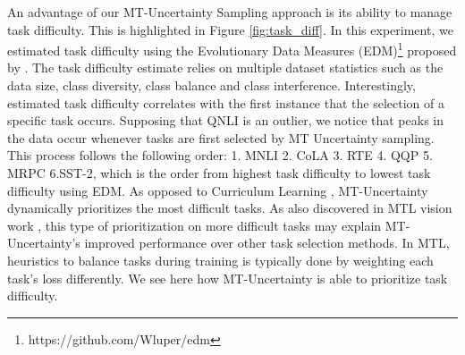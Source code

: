 \documentclass{article} \usepackage{iclr2021_conference,times}
\begin{document}
\clearpage
An advantage of our MT-Uncertainty Sampling approach is its ability to manage task difficulty. This is highlighted in Figure \ref{fig:task_diff}. In this experiment, we estimated task difficulty using the Evolutionary Data Measures (EDM)\footnote{https://github.com/Wluper/edm} proposed by \citet{collins-etal-2018-evolutionary}. The task difficulty estimate relies on multiple dataset statistics such as the data size, class diversity, class balance and class interference. Interestingly, estimated task difficulty correlates with the first instance that the selection of a specific task occurs. Supposing that QNLI is an outlier, we notice that peaks in the data occur whenever tasks are first selected by MT Uncertainty sampling. This process follows the following order: 1. MNLI 2. CoLA 3. RTE 4. QQP 5. MRPC 6.SST-2, which is the order from highest task difficulty to lowest task difficulty using EDM. As opposed to Curriculum Learning \citep{bengio2009curriculum}, MT-Uncertainty dynamically prioritizes the most difficult tasks. As also discovered in MTL vision work \citep{Guo_2018_ECCV}, this type of prioritization on more difficult tasks may explain MT-Uncertainty's improved performance over other task selection methods. In MTL, heuristics to balance tasks during training is typically done by weighting each task's loss differently. We see here how MT-Uncertainty is able to prioritize task difficulty.
\end{document}
